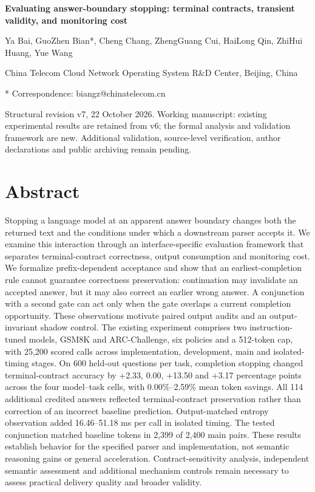 \documentclass[12pt,a4paper]{article}
\begin{document}
\doublespacing
\linenumbers
{\Large\bfseries Evaluating answer-boundary stopping: terminal contracts, transient validity, and monitoring cost\par}
Ya Bai, GuoZhen Bian*, Cheng Chang, ZhengGuang Cui, HaiLong Qin, ZhiHui Huang, Yue Wang

China Telecom Cloud Network Operating System R\&D Center, Beijing, China

* Correspondence: biangz@chinatelecom.cn

Structural revision v7, 22 October 2026. Working manuscript: existing experimental results are retained from v6; the formal analysis and validation framework are new. Additional validation, source-level verification, author declarations and public archiving remain pending.

\section*{Abstract}
Stopping a language model at an apparent answer boundary changes both the returned text and the conditions under which a downstream parser accepts it. We examine this interaction through an interface-specific evaluation framework that separates terminal-contract correctness, output consumption and monitoring cost. We formalize prefix-dependent acceptance and show that an earliest-completion rule cannot guarantee correctness preservation: continuation may invalidate an accepted answer, but it may also correct an earlier wrong answer. A conjunction with a second gate can act only when the gate overlaps a current completion opportunity. These observations motivate paired output audits and an output-invariant shadow control. The existing experiment comprises two instruction-tuned models, GSM8K and ARC-Challenge, six policies and a 512-token cap, with 25,200 scored calls across implementation, development, main and isolated-timing stages. On 600 held-out questions per task, completion stopping changed terminal-contract accuracy by +2.33, 0.00, +13.50 and +3.17 percentage points across the four model--task cells, with 0.00\%--2.59\% mean token savings. All 114 additional credited answers reflected terminal-contract preservation rather than correction of an incorrect baseline prediction. Output-matched entropy observation added 16.46--51.18 ms per call in isolated timing. The tested conjunction matched baseline tokens in 2,399 of 2,400 main pairs. These results establish behavior for the specified parser and implementation, not semantic reasoning gains or general acceleration. Contract-sensitivity analysis, independent semantic assessment and additional mechanism controls remain necessary to assess practical delivery quality and broader validity.
\end{document}
